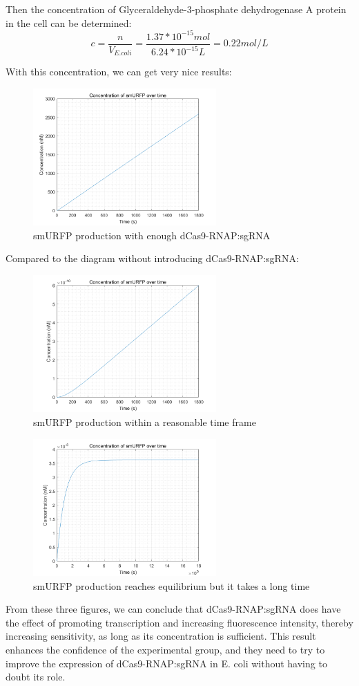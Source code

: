 Then the concentration of Glyceraldehyde-3-phosphate dehydrogenase A protein in the cell can be determined:
\begin{displaymath}
	c=\frac{n}{V_{E.coli}}=\frac{1.37*10^{-15}mol}{6.24*10^{-15}L}=0.22mol/L
\end{displaymath}

With this concentration, we can get very nice results:

\begin{figure}[H]
	\centering
	\includegraphics[width=7cm]{23}
	\caption{smURFP production with enough dCas9-RNAP:sgRNA}
\end{figure}

Compared to the diagram without introducing dCas9-RNAP:sgRNA:

\begin{figure}[!htbp]
	\centering
	\includegraphics[width=7cm]{21}
	\caption{smURFP production within a reasonable time frame}
\end{figure}

\begin{figure}[!htbp]
	\centering
	\includegraphics[width=7cm]{22}
	\caption{smURFP production reaches equilibrium but it takes a long time}
\end{figure}

From these three figures, we can conclude that dCas9-RNAP:sgRNA does have the effect of promoting transcription and increasing fluorescence intensity, thereby increasing sensitivity, as long as its concentration is sufficient. This result enhances the confidence of the experimental group, and they need to try to improve the expression of dCas9-RNAP:sgRNA in E. coli without having to doubt its role.



